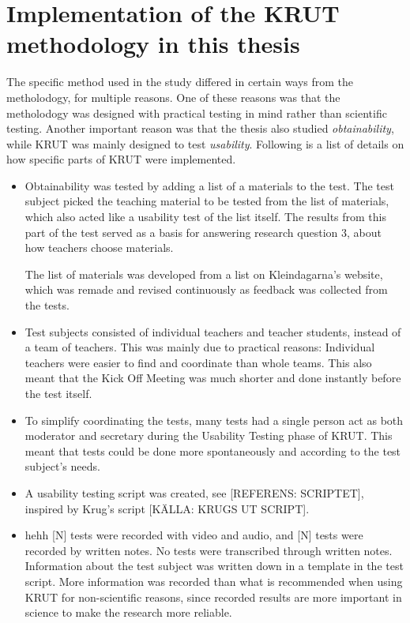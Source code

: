 \section{Implementation of the KRUT methodology in this thesis}
The specific method used in the study differed in certain ways from the metholodogy, for multiple reasons. One of these reasons was that the metholodogy was designed with practical testing in mind rather than scientific testing. Another important reason was that the thesis also studied \textit{obtainability}, while KRUT was mainly designed to test \textit{usability}. Following is a list of details on how specific parts of KRUT were implemented.

\begin{itemize}

\item Obtainability was tested by adding a list of a materials to the test. The test subject picked the teaching material to be tested from the list of materials, which also acted like a usability test of the list itself. The results from this part of the test served as a basis for answering research question 3, about how teachers choose materials.

The list of materials was developed from a list on Kleindagarna's website, which was remade and revised continuously as feedback was collected from the tests.

\item Test subjects consisted of individual teachers and teacher students, instead of a team of teachers. This was mainly due to practical reasons: Individual teachers were easier to find and coordinate than whole teams. This also meant that the Kick Off Meeting was much shorter and done instantly before the test itself.

\item To simplify coordinating the tests, many tests had a single person act as both moderator and secretary during the Usability Testing phase of KRUT. This meant that tests could be done more spontaneously and according to the test subject's needs.

\item A usability testing script was created, see [REFERENS: SCRIPTET], inspired by Krug's script [KÄLLA: KRUGS UT SCRIPT].

\item hehh [N] tests were recorded with video and audio, and [N] tests were recorded by written notes. No tests were transcribed through written notes. Information about the test subject was written down in a template in the test script. More information was recorded than what is recommended when using KRUT for non-scientific reasons, since recorded results are more important in science to make the research more reliable.


\end{itemize}
